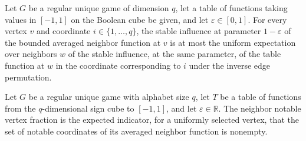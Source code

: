 \begin{theorem}
\label{FABL.RegularUniqueGame.stableInfluence_boundedAveragedNeighborFunction_le}
\leanok
{}
Let $G$ be a regular unique game of dimension $q$, let a table of functions taking
values in $[-1,1]$ on the Boolean cube be given, and let $\varepsilon\in[0,1]$. For
every vertex $v$ and coordinate $i\in\{1,\ldots,q\}$, the stable influence at parameter
$1-\varepsilon$ of the bounded averaged neighbor function at $v$ is at most the uniform
expectation over neighbors $w$ of the stable influence, at the same parameter, of the
table function at $w$ in the coordinate corresponding to $i$ under the inverse edge
permutation.
\end{theorem}

\begin{definition}
\label{FABL.RegularUniqueGame.boundedNeighborNotableVertexFraction}
\leanok
{}
Let $G$ be a regular unique game with alphabet size $q$, let $T$ be a table of functions
from the $q$-dimensional sign cube to $[-1,1]$, and let $\varepsilon\in\mathbb R$. The
neighbor notable vertex fraction is the expected indicator, for a uniformly selected
vertex, that the set of notable coordinates of its averaged neighbor function is
nonempty.
\end{definition}

